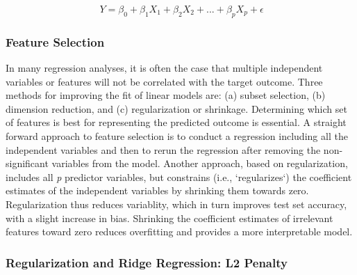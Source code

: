 \documentclass[sigconf]{acmart}
\begin{document}
\begin{equation}
  \ Y = \beta_0 + \beta_1X_1 + \beta_2X_2 +... + \beta_pX_p + \epsilon
\end{equation}


\subsubsection{Feature Selection} 

In many regression analyses, it is often the case that multiple independent 
variables or features will not be correlated with the target outcome. Three 
methods for improving the fit of linear models are: (a) subset selection, 
(b) dimension reduction, and (c) regularization or shrinkage. Determining 
which set of features is best for representing the predicted outcome is 
essential. A straight forward approach to feature selection is to conduct a 
regression including all the independent variables and then to rerun the 
regression after removing the non-significant variables from the model.
Another approach, based on regularization, includes all \textit{p} predictor 
variables, but constrains (i.e., `regularizes`) the coefficient estimates of 
the independent variables by shrinking them towards zero. Regularization thus 
reduces variablity, which in turn improves test set accuracy, with a slight 
increase in bias. Shrinking the coefficient estimates of irrelevant features 
toward zero reduces overfitting and provides a more interpretable model. 


\subsubsection{Regularization and Ridge Regression: L2 Penalty} 
\end{document}
